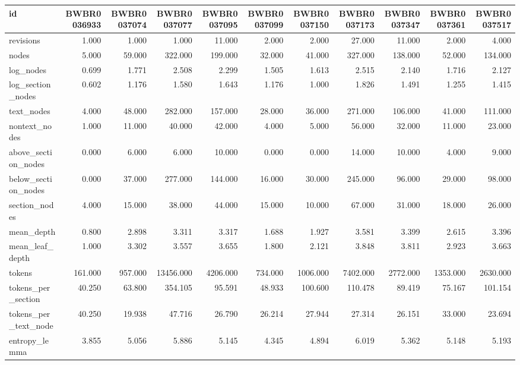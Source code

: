 \begin{tabular}{lrrrrrrrrrr}
\toprule
id & BWBR0036933 & BWBR0037074 & BWBR0037077 & BWBR0037095 & BWBR0037099 & BWBR0037150 & BWBR0037173 & BWBR0037347 & BWBR0037361 & BWBR0037517 \\
\midrule
revisions & 1.000 & 1.000 & 1.000 & 11.000 & 2.000 & 2.000 & 27.000 & 11.000 & 2.000 & 4.000 \\
\cline{1-11}
nodes & 5.000 & 59.000 & 322.000 & 199.000 & 32.000 & 41.000 & 327.000 & 138.000 & 52.000 & 134.000 \\
\cline{1-11}
log\_nodes & 0.699 & 1.771 & 2.508 & 2.299 & 1.505 & 1.613 & 2.515 & 2.140 & 1.716 & 2.127 \\
\cline{1-11}
log\_section\_nodes & 0.602 & 1.176 & 1.580 & 1.643 & 1.176 & 1.000 & 1.826 & 1.491 & 1.255 & 1.415 \\
\cline{1-11}
text\_nodes & 4.000 & 48.000 & 282.000 & 157.000 & 28.000 & 36.000 & 271.000 & 106.000 & 41.000 & 111.000 \\
\cline{1-11}
nontext\_nodes & 1.000 & 11.000 & 40.000 & 42.000 & 4.000 & 5.000 & 56.000 & 32.000 & 11.000 & 23.000 \\
\cline{1-11}
above\_section\_nodes & 0.000 & 6.000 & 6.000 & 10.000 & 0.000 & 0.000 & 14.000 & 10.000 & 4.000 & 9.000 \\
\cline{1-11}
below\_section\_nodes & 0.000 & 37.000 & 277.000 & 144.000 & 16.000 & 30.000 & 245.000 & 96.000 & 29.000 & 98.000 \\
\cline{1-11}
section\_nodes & 4.000 & 15.000 & 38.000 & 44.000 & 15.000 & 10.000 & 67.000 & 31.000 & 18.000 & 26.000 \\
\cline{1-11}
mean\_depth & 0.800 & 2.898 & 3.311 & 3.317 & 1.688 & 1.927 & 3.581 & 3.399 & 2.615 & 3.396 \\
\cline{1-11}
mean\_leaf\_depth & 1.000 & 3.302 & 3.557 & 3.655 & 1.800 & 2.121 & 3.848 & 3.811 & 2.923 & 3.663 \\
\cline{1-11}
tokens & 161.000 & 957.000 & 13456.000 & 4206.000 & 734.000 & 1006.000 & 7402.000 & 2772.000 & 1353.000 & 2630.000 \\
\cline{1-11}
tokens\_per\_section & 40.250 & 63.800 & 354.105 & 95.591 & 48.933 & 100.600 & 110.478 & 89.419 & 75.167 & 101.154 \\
\cline{1-11}
tokens\_per\_text\_node & 40.250 & 19.938 & 47.716 & 26.790 & 26.214 & 27.944 & 27.314 & 26.151 & 33.000 & 23.694 \\
\cline{1-11}
entropy\_lemma & 3.855 & 5.056 & 5.886 & 5.145 & 4.345 & 4.894 & 6.019 & 5.362 & 5.148 & 5.193 \\

\end{tabular}
